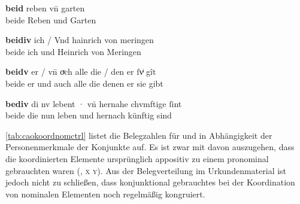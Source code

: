 \begin{exe}
\ex \label{ex:caokonj2ctrl}
	\begin{xlist}
	\ex \label{ex:caokonj2ctrl_1}
		\gll \textbf{beid} reben vn̄ garten \\
			beide Reben und Garten \\
		\begin{taggedline}{\parencites(Basel, 1296)[\pno~2353, 462.28--29]{cao3}}
		\trans {}
		\end{taggedline}

	\ex \label{ex:caokonj2ctrl_2}
		\gll \textbf{beidiv} ich / Vnd hainrich von meringen \\
			beide ich {} und Heinrich von Meringen \\
		\begin{taggedline}{\parencites(Kl.~Steingaden, Kr.~Weilheim-Schongau, 1291)[\pno~1347, 578.25]{cao1}}
		\trans {}
		\end{taggedline}

	\ex \label{ex:caokonj2ctrl_3}
		\gll \textbf{beidv} er / vn̄ oͮch alle die / den er ſvͥ gît \\
			beide er {} und auch alle die {} denen er sie gibt \\
		\begin{taggedline}{\parencites(Hüfingen, Schwarzwald-Baar-Kr., 1292)[\pno~1566, 717.18]{cao2}}
		\trans {}
		\end{taggedline}

	\ex \label{ex:caokonj2ctrl_4}
		\gll \textbf{bediv} di nv lebent · vn̄ hernahe chvmftige ſint \\
			beide die nun leben {} und hernach künftig sind \\
		\begin{taggedline}{\parencites(Wien, 1291)[\pno~1352, 580.8]{cao2}}
		\trans {}
		\end{taggedline}
	\end{xlist}
\end{exe}

\cref{tab:caokoordnomctrl} listet die Belegzahlen für  und
 in Abhängigkeit der Personenmerkmale der Konjunkte auf. Es ist
zwar mit \citet[626]{ksw2} davon auszugehen, dass die koordinierten Elemente
ursprünglich appositiv zu einem pronominal gebrauchten  waren
(, \textsc{x}  \textsc{y}). Aus der Belegverteilung im
Urkundenmaterial ist jedoch nicht  zu schließen, dass konjunktional
gebrauchtes  bei der Koordination von nominalen Elementen noch
regelmäßig kongruiert.

